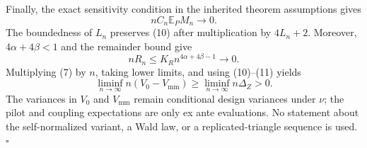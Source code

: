 Finally, the exact sensitivity condition in the inherited theorem assumptions gives
\[
 nC_n\mathbb E_PM_n\longrightarrow0.
 \tag{10}
\]
The boundedness of \(L_n\) preserves (10) after multiplication by \(4L_n+2\).  Moreover, \(4\alpha+4\beta<1\) and the remainder bound give
\[
 nR_n\leq K_Rn^{4\alpha+4\beta-1}\longrightarrow0.
 \tag{11}
\]
Multiplying (7) by \(n\), taking lower limits, and using (10)--(11) yields
\[
 \liminf_{n\to\infty}n(V_0-V_{\mathrm{mm}})
 \geq\liminf_{n\to\infty}n\Delta_Z>0.
\]
The variances in \(V_0\) and \(V_{\mathrm{mm}}\) remain conditional design variances under \(\nu\); the pilot and coupling expectations are only ex ante evaluations.  No statement about the self-normalized variant, a Wald law, or a replicated-triangle sequence is used. \(\square\)